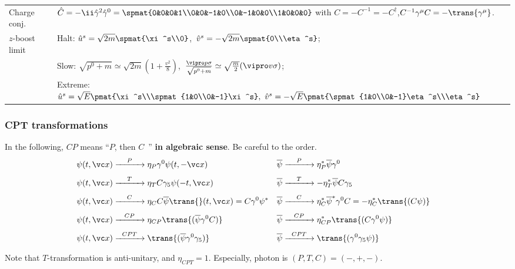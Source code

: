 \begin{tabular}{l@{ :\ \ \ }l}
Charge conj. & $\hat C=-\ii\hat\gamma^2\hat\gamma^0
 = \spmat{0&0&0&1\\0&0&-1&0\\0&-1&0&0\\1&0&0&0}$\qquad
                 with $C=-C^{-1}=-C^\dagger$,\quad $C^{-1}\Gm C=-\trans{\Gm}$.\\
$z$-boost limit &
Halt: $\hat u^s=\sqrt{2m}\spmat{\xi^s\\0}$,\ $\hat v^s=-\sqrt{2m}\spmat{0\\\eta^s}$;\\
&Slow:
$\sqrt{p^0+m}\simeq\sqrt{2m}(1+\frac{v^2}8)$,\
$\frac{\vipro p\sigma}{\sqrt{p^0+m}}\simeq\sqrt{\frac m2}(\vipro v\sigma)$;\\
&Extreme: 
  $\hat u^s=\sqrt E\pmat{\xi^s\\\spmat{1&0\\0&-1}\xi^s},\
   \hat v^s=-\sqrt E\pmat{\spmat{1&0\\0&-1}\eta^s\\\eta^s}$\\
\end{tabular}


\subsubsection{CPT transformations}
\vspace{-19pt}
\begin{flushright}
{}\vspace{-5pt}
\end{flushright}
In the following, $CP$ means ``$P$, then $C$\ '' {\bf in algebraic sense}. Be careful to the order.
\begin{align*}
 \psi(t,\vc x) &\xrightarrow[\hskip30pt]{P} \eta_P  \G0\psi(t,-\vc x)&
 \overline\psi       &\xrightarrow[\hskip30pt]{P} \eta_P^* \overline\psi\G0\\
 \psi(t,\vc x) &\xrightarrow[\hskip30pt]{T} \eta_T C\G5\psi(-t,\vc x)&
 \overline\psi       &\xrightarrow[\hskip30pt]{T} -\eta_T^* \overline\psi C\G5\\
 \psi(t,\vc x) &\xrightarrow[\hskip30pt]{C} \eta_C   C\overline\psi\trans{}(t,\vc x)=C\G0\psi^*&
 \overline\psi       &\xrightarrow[\hskip30pt]{C} \eta_C^* \overline\psi^*\G0C = -\eta_C^*\trans{(C\psi)}\\
 \psi(t,\vc x) &\xrightarrow[\hskip30pt]{CP} \eta_{CP}\trans{(\overline\psi \G0C)}&
 \overline\psi       &\xrightarrow[\hskip30pt]{CP} \eta_{CP}^*\trans{(C\G0\psi)}\\
 \psi(t,\vc x) &\xrightarrow[\hskip30pt]{CPT} \trans{(\overline\psi\G0\G5)}&
 \overline\psi       &\xrightarrow[\hskip30pt]{CPT} \trans{(\G0\G5\psi)}&
\end{align*}
Note that $T$-transformation is anti-unitary, and $\eta_{CPT}=1$.
Especially, photon is $(P,T,C)=(-,+,-)$.


